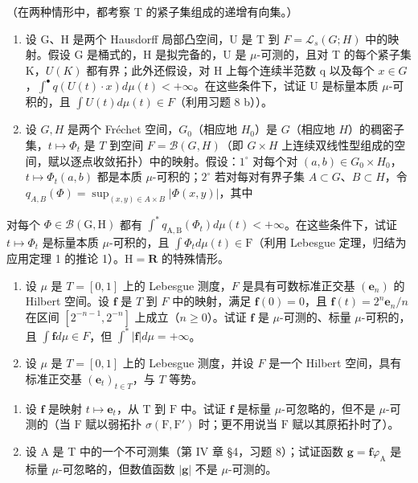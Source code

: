 （在两种情形中，都考察 T 的紧子集组成的递增有向集。）

\begin{enumerate}
\def\labelenumi{\arabic{enumi})}
\setcounter{enumi}{8}
\item
  设 G、H 是两个 Hausdorff 局部凸空间，U 是 T 到 \(F = \mathcal{L}_{s}(G;H)\) 中的映射。假设 G 是桶式的，H 是拟完备的，U 是 \(\mu\)-可测的，且对 T 的每个紧子集 K，\(U(K)\) 都有界；此外还假设，对 H 上每个连续半范数 q 以及每个 \(x \in G\)，\(\int^{\bullet} q(U(t) \cdot x) d\mu(t) < +\infty\)。在这些条件下，试证 U 是标量本质 \(\mu\)-可积的，且 \(\int U(t) d\mu(t) \in F\)（利用习题 8 b））。
\item
  设 \(G, H\) 是两个 Fréchet 空间，\(G_0\)（相应地 \(H_0\)）是 \(G\)（相应地 \(H\)）的稠密子集，\(t \mapsto \Phi_t\) 是 \(T\) 到空间 \(F = \mathcal{B}(G, H)\)（即 \(G \times H\) 上连续双线性型组成的空间，赋以逐点收敛拓扑）中的映射。假设：\(1^\circ\) 对每个对 \((a, b) \in G_0 \times H_0\)，\(t \mapsto \Phi_t(a, b)\) 都是本质 \(\mu\)-可积的；\(2^\circ\) 若对每对有界子集 \(A \subset G\)、\(B \subset H\)，令 \(q_{A,B}(\Phi) = \sup_{(x, y) \in A \times B} |\Phi(x, y)|\)，其中
\end{enumerate}

对每个 \(\Phi \in \mathcal{B}(\mathrm{G},\mathrm{H})\) 都有 \(\int^{*}q_{\mathrm{A},\mathrm{B}}(\Phi_t)d\mu (t) < + \infty\)。在这些条件下，试证 \(t\mapsto \Phi_t\) 是标量本质 \(\mu\)-可积的，且 \(\int \Phi_t d\mu (t)\in \mathrm{F}\)（利用 Lebesgue 定理，归结为应用定理 1 的推论 1）。\(\mathrm{H} = \mathbf{R}\) 的特殊情形。

\begin{enumerate}
\def\labelenumi{\arabic{enumi})}
\setcounter{enumi}{10}
\item
  设 \(\mu\) 是 \(T = [0,1]\) 上的 Lebesgue 测度，\(F\) 是具有可数标准正交基 \((\mathbf{e}_n)\) 的 Hilbert 空间。设 \(\mathbf{f}\) 是 \(T\) 到 \(F\) 中的映射，满足 \(\mathbf{f}(0) = 0\)，且 \(\mathbf{f}(t) = 2^n \mathbf{e}_n / n\) 在区间 \([2^{-n-1}, 2^{-n}]\) 上成立（\(n \geqslant 0\)）。试证 \(\mathbf{f}\) 是 \(\mu\)-可测的、标量 \(\mu\)-可积的，且 \(\int \mathbf{f} d\mu \in F\)，但 \(\int^* |\mathbf{f}| d\mu = +\infty\)。
\item
  设 \(\mu\) 是 \(T = [0,1]\) 上的 Lebesgue 测度，并设 \(F\) 是一个 Hilbert 空间，具有标准正交基 \((\mathbf{e}_t)_{t \in T}\)，与 \(T\) 等势。
\end{enumerate}

\begin{enumerate}
\def\labelenumi{\alph{enumi})}
\item
  设 \(\mathbf{f}\) 是映射 \(t \mapsto \mathbf{e}_t\)，从 \(\mathrm{T}\) 到 \(\mathrm{F}\) 中。试证 \(\mathbf{f}\) 是标量 \(\mu\)-可忽略的，但不是 \(\mu\)-可测的（当 \(\mathrm{F}\) 赋以弱拓扑 \(\sigma(\mathrm{F}, \mathrm{F}')\) 时；更不用说当 \(\mathrm{F}\) 赋以其原拓扑时了）。
\item
  设 A 是 T 中的一个不可测集（第 IV 章 §4，习题 8）；试证函数 \(\mathbf{g} = \mathbf{f}\varphi_{\mathrm{A}}\) 是标量 \(\mu\)-可忽略的，但数值函数 \(|\mathbf{g}|\) 不是 \(\mu\)-可测的。
\end{enumerate}


